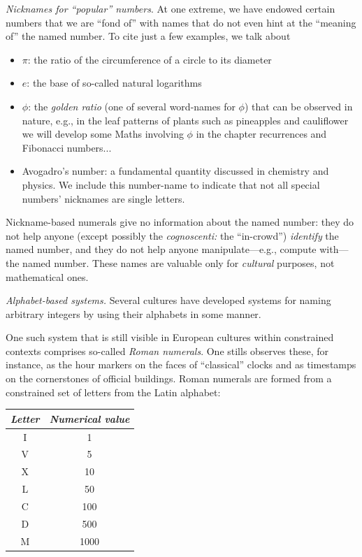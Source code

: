 \noindent
{\it Nicknames for ``popular'' numbers}.
%
At one extreme, we have endowed certain numbers that we are ``fond
of'' with names that do not even hint at the ``meaning of'' the named
number.  To cite just a few examples, we talk about
\begin{itemize}
\item
$\pi$: the ratio of the circumference of a circle to its diameter
\item
$e$: the base of so-called natural logarithms
\item
$\phi$: the {\it golden ratio} (one of several word-names for $\phi$)
  that can be observed in nature, e.g., in the leaf patterns of plants
  such as pineapples and cauliflower
  {\Denis we will develop some Maths involving $\phi$  in the chapter recurrences and Fibonacci numbers...}
\item
Avogadro's number: a fundamental quantity discussed in chemistry and
physics.  We include this number-name to indicate that not all
special numbers' nicknames are single letters.
\end{itemize}
Nickname-based numerals give no information about the named number:
they do not help anyone (except possibly the {\it cognoscenti:} the
``in-crowd'') {\em identify} the named number, and they do not help
anyone manipulate---e.g., compute with---the named number.  These
names are valuable only for {\em cultural} purposes, not mathematical
ones.
\medskip

\noindent
{\it Alphabet-based systems.}
%
Several cultures have developed systems for naming arbitrary integers
by using their alphabets in some manner.

One such system that is still visible in European cultures within
constrained contexts comprises so-called {\it Roman numerals}.  One
stills observes these, for instance, as the hour markers on the faces
of ``classical'' clocks and as timestamps on the cornerstones of
official buildings.  Roman numerals are formed from a constrained set
of letters from the Latin alphabet:

\begin{tabular}{c|c}
{\it Letter} & {\it Numerical value} \\
\hline
I  & 1 \\
V  & 5 \\
X  & 10 \\
L  & 50 \\
C  & 100 \\
D  & 500 \\
M  & 1000
\end{tabular}

